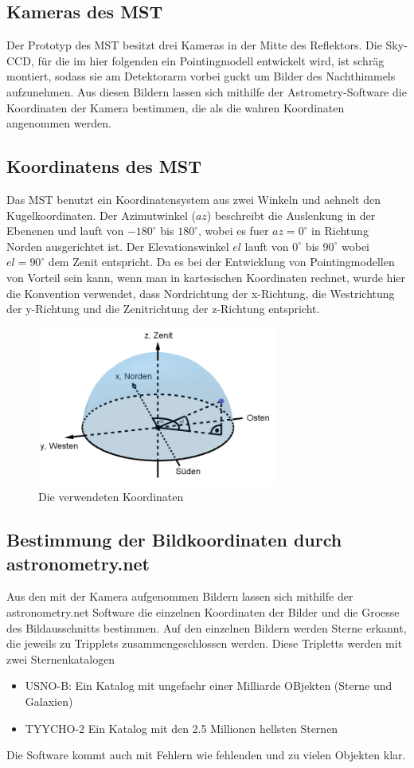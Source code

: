 \subsection{Kameras des MST}
Der Prototyp des MST besitzt drei Kameras in der Mitte des Reflektors. Die Sky-CCD, für die im hier folgenden ein Pointingmodell entwickelt wird, ist schräg montiert, sodass sie am Detektorarm vorbei guckt um Bilder des Nachthimmels aufzunehmen. Aus diesen Bildern lassen sich mithilfe der Astrometry-Software die Koordinaten der Kamera bestimmen, die als die wahren Koordinaten angenommen werden.

\subsection{Koordinatens des MST}
Das MST benutzt ein Koordinatensystem aus zwei Winkeln und aehnelt den Kugelkoordinaten. Der Azimutwinkel ($az$) beschreibt die Auslenkung in der Ebenenen und lauft von $-180^{\circ}$ bis $180^{\circ}$, wobei es fuer $az=0^{\circ}$ in Richtung Norden ausgerichtet ist. Der Elevationswinkel $el$ lauft von $0^{\circ}$ bis $90^{\circ}$ wobei $el=90^{\circ}$ dem Zenit entspricht. Da es bei der Entwicklung von Pointingmodellen von Vorteil sein kann, wenn man in kartesischen Koordinaten rechnet, wurde hier die Konvention verwendet, dass Nordrichtung der x-Richtung, die Westrichtung der y-Richtung und die Zenitrichtung der z-Richtung entspricht.
\begin{figure}[htbp]
\centering
\includegraphics[width=0.7\textwidth]{Images/coordinates.png}
\caption{Die verwendeten Koordinaten}
\label{img:coordinates}
\end{figure}
\subsection{Bestimmung der Bildkoordinaten durch astronometry.net}
Aus den mit der Kamera aufgenommen Bildern lassen sich mithilfe der astronometry.net Software die einzelnen Koordinaten der Bilder und die Groesse des Bildausschnitts bestimmen. Auf den einzelnen Bildern werden Sterne erkannt, die jeweils zu Tripplets zusammengeschlossen werden. Diese Tripletts werden mit zwei Sternenkatalogen 
\begin{itemize}
\item USNO-B: Ein Katalog mit ungefaehr einer Milliarde OBjekten (Sterne und Galaxien)
\item TYYCHO-2 Ein Katalog mit den 2.5 Millionen hellsten Sternen
\end{itemize}
Die Software kommt auch mit Fehlern wie fehlenden und zu vielen Objekten klar.
